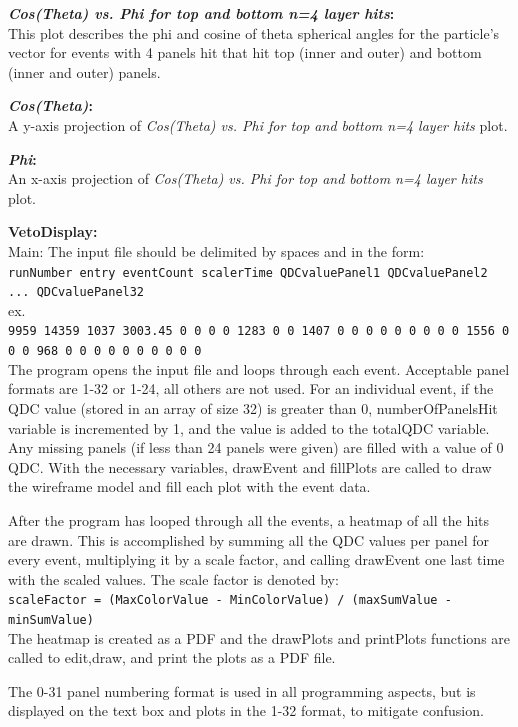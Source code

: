 \documentclass[a4paper,12pt]{article}
\begin{document}
\textbf{\emph{Cos(Theta) vs. Phi for top and bottom n=4 layer hits}:} \\
This plot describes the phi and cosine of theta spherical angles for the particle's vector for events with 4 panels hit that hit top (inner and outer) and bottom (inner and outer) panels. 

\textbf{\emph{Cos(Theta)}:} \\
A y-axis projection of \emph{Cos(Theta) vs. Phi for top and bottom n=4 layer hits} plot.

\textbf{\emph{Phi}:} \\
An x-axis projection of \emph{Cos(Theta) vs. Phi for top and bottom n=4 layer hits} plot.

\pagebreak

\textbf{VetoDisplay:} \\
Main:
The input file should be delimited by spaces and in the form: \\
\texttt{runNumber entry eventCount scalerTime QDCvaluePanel1 QDCvaluePanel2 ... QDCvaluePanel32} \\
ex. \\
\texttt{9959 14359 1037 3003.45 0 0 0 0 1283 0 0 1407 0 0 0 0 0 0 0 0 0 1556 0 0 0 968 0 0 0 0 0 0 0 0 0 0 } \\
The program opens the input file and loops through each event. Acceptable panel formats are 1-32 or 1-24, all others are not used. For an individual event, if the QDC value (stored in an array of size 32) is greater than 0, numberOfPanelsHit variable is incremented by 1, and the value is added to the totalQDC variable. Any missing panels (if less than 24 panels were given) are filled with a value of 0 QDC. With the necessary variables, drawEvent and fillPlots are called to draw the wireframe model and fill each plot with the event data. 

After the program has looped through all the events, a heatmap of all the hits are drawn. This is accomplished by summing all the QDC values per panel for every event, multiplying it by a scale factor, and calling drawEvent one last time with the scaled values. The scale factor is denoted by: \\
\texttt{scaleFactor = (MaxColorValue - MinColorValue) / (maxSumValue - minSumValue)} \\
The heatmap is created as a PDF and the drawPlots and printPlots functions are called to edit,draw, and print the plots as a PDF file.

The 0-31 panel numbering format is used in all programming aspects, but is displayed on the text box and plots in the 1-32 format, to mitigate confusion.
\end{document}
